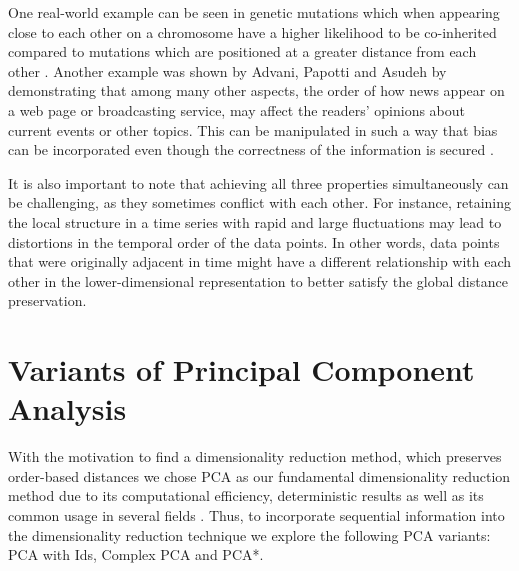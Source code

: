 \documentclass[pdftex,12pt,a4paper]{report}
\begin{document}
One real-world example can be seen in genetic mutations which when appearing close to each other on a chromosome have a higher likelihood to be co-inherited compared to mutations which are positioned at a greater distance from each other \cite{order-important}.
Another example was shown by Advani, Papotti and Asudeh \cite{news-ordering} by demonstrating that among many other aspects, the order of how news appear on a web page or broadcasting service, may affect the readers' opinions about current events or other topics.
This can be manipulated in such a way that bias can be incorporated even though the correctness of the information is secured \cite{inject-bias}.

It is also important to note that achieving all three properties simultaneously can be challenging, as they sometimes conflict with each other.
For instance, retaining the local structure in a time series with rapid and large fluctuations may lead to distortions in the temporal order of the data points.
In other words, data points that were originally adjacent in time might have a different relationship with each other in the lower-dimensional representation to better satisfy the global distance preservation.


\section{Variants of Principal Component Analysis} \label{variants-pca}
With the motivation to find a dimensionality reduction method, which preserves order-based distances we chose PCA as our fundamental dimensionality reduction method due to its computational efficiency, deterministic results as well as its common usage in several fields \cite{pca-often}.
Thus, to incorporate sequential information into the dimensionality reduction technique we explore the following PCA variants: PCA with Ids, Complex PCA and PCA*.
\end{document}
